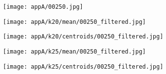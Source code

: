 \documentclass[draft,final]{vutinfth} %
\begin{document}
\begin{appendices}
\begin{figure}[h]
\centering
  \begin{subfigure}[t]{0.19\columnwidth}
    \centering
    \texttt{[image: appA/00250.jpg]}
  \end{subfigure}
  \begin{subfigure}[t]{0.19\columnwidth}
    \centering
    \texttt{[image: appA/k20/mean/00250\_filtered.jpg]}
  \end{subfigure}
  \begin{subfigure}[t]{0.19\columnwidth}
    \centering
    \texttt{[image: appA/k20/centroids/00250\_filtered.jpg]}
  \end{subfigure}
  \begin{subfigure}[t]{0.19\columnwidth}
    \centering
    \texttt{[image: appA/k25/mean/00250\_filtered.jpg]}
  \end{subfigure}
  \begin{subfigure}[t]{0.19\columnwidth}
    \centering
    \texttt{[image: appA/k25/centroids/00250\_filtered.jpg]}
  \end{subfigure}
\caption{}
\end{figure}  

\end{appendices}
\end{document}
